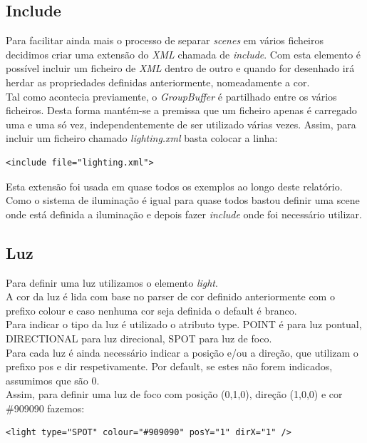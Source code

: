 \documentclass[a4paper]{report}
\begin{document}
\subsection{Include}
Para facilitar ainda mais o processo de separar \textit{scenes} em vários
ficheiros decidimos criar uma extensão do \textit{XML} chamada de
\textit{include}. Com esta elemento é possível incluir um ficheiro de \textit{XML}
dentro de outro e quando for desenhado irá herdar as propriedades definidas
anteriormente, nomeadamente a cor.\\
Tal como acontecia previamente, o \textit{GroupBuffer} é partilhado entre os
vários ficheiros. Desta forma mantém-se a premissa que um ficheiro apenas é
carregado uma e uma só vez, independentemente de ser utilizado várias vezes.
Assim, para incluir um ficheiro chamado \textit{lighting.xml} basta colocar a
linha:

\begin{lstlisting}
<include file="lighting.xml">
\end{lstlisting}
Esta extensão foi usada em quase todos os exemplos ao longo deste relatório.
Como o sistema de iluminação é igual para quase todos bastou definir uma scene
onde está definida a iluminação e depois fazer \textit{include} onde foi
necessário utilizar.


\subsection{Luz}
Para definir uma luz utilizamos o elemento \textit{light}.\\
A cor da luz é lida com base no parser de cor definido anteriormente com o
prefixo colour e caso nenhuma cor seja definida o default é branco.\\
Para indicar o tipo da luz é utilizado o atributo type. POINT é para luz
pontual, DIRECTIONAL para luz direcional, SPOT para luz de foco.\\
Para cada luz é ainda necessário indicar a posição e/ou a direção, que utilizam
o prefixo pos e dir respetivamente. Por default, se estes não forem indicados,
assumimos que são 0.\\
Assim, para definir uma luz de foco com posição (0,1,0), direção (1,0,0) e cor
\#909090 fazemos:
\begin{lstlisting}
<light type="SPOT" colour="#909090" posY="1" dirX="1" />
\end{lstlisting}
\end{document}
